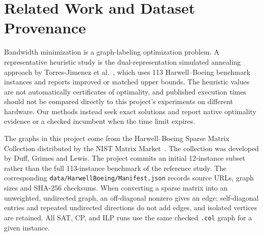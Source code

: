 \section{Related Work and Dataset Provenance}\label{sec:dataset}

Bandwidth minimization is a graph-labeling optimization problem. A
representative heuristic study is the dual-representation simulated
annealing approach by Torres-Jimenez et al.\ \cite{torres2015drsa}, which
uses 113 Harwell--Boeing benchmark instances and reports improved or
matched upper bounds. The heuristic values are not automatically
certificates of optimality, and published execution times should not
be compared directly to this project's experiments on different
hardware. Our methods instead seek exact solutions and report native
optimality evidence or a checked incumbent when the time limit expires.

The graphs in this project come from the Harwell--Boeing Sparse Matrix
Collection distributed by the NIST Matrix Market~\cite{nistmatrixmarket}.
The collection was developed by Duff, Grimes and Lewis. The project
commits an initial 12-instance subset rather than the full 113-instance
benchmark of the reference study. The corresponding
\texttt{data/HarwellBoeing/Manifest.json} records source URLs, graph
sizes and SHA-256 checksums. When converting a sparse matrix into an
unweighted, undirected graph, an off-diagonal nonzero gives an edge;
self-diagonal entries and repeated undirected directions do not add
edges, and isolated vertices are retained. All SAT, CP, and ILP runs
use the same checked \texttt{.col} graph for a given instance.
